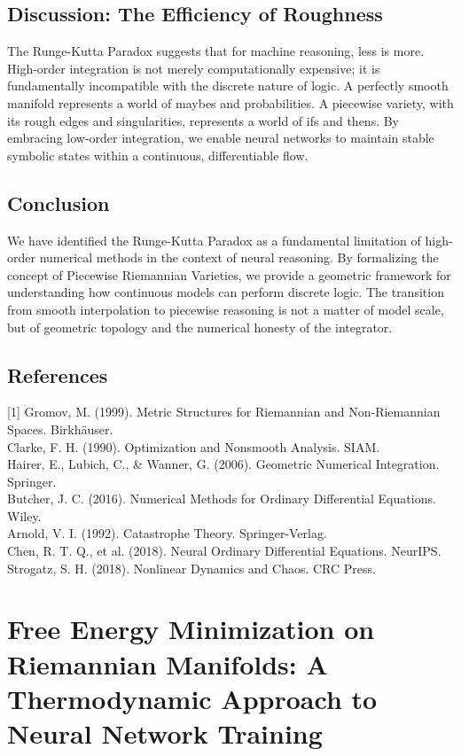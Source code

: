 \documentclass{article}
\numberwithin{equation}{section}
\begin{document}
\subsection{Discussion: The Efficiency of Roughness}
The Runge-Kutta Paradox suggests that for machine reasoning, less is more. High-order integration is not merely computationally expensive; it is fundamentally incompatible with the discrete nature of logic.
A perfectly smooth manifold represents a world of maybes and probabilities. A piecewise variety, with its rough edges and singularities, represents a world of ifs and thens. By embracing low-order integration, we enable neural networks to maintain stable symbolic states within a continuous, differentiable flow.

\subsection{Conclusion}
We have identified the Runge-Kutta Paradox as a fundamental limitation of high-order numerical methods in the context of neural reasoning. By formalizing the concept of Piecewise Riemannian Varieties, we provide a geometric framework for understanding how continuous models can perform discrete logic. The transition from smooth interpolation to piecewise reasoning is not a matter of model scale, but of geometric topology and the numerical honesty of the integrator.

\subsection*{References}
[1] Gromov, M. (1999). Metric Structures for Riemannian and Non-Riemannian Spaces. Birkhäuser.\\
[2] Clarke, F. H. (1990). Optimization and Nonsmooth Analysis. SIAM.\\
[3] Hairer, E., Lubich, C., \& Wanner, G. (2006). Geometric Numerical Integration. Springer.\\
[4] Butcher, J. C. (2016). Numerical Methods for Ordinary Differential Equations. Wiley.\\
[5] Arnold, V. I. (1992). Catastrophe Theory. Springer-Verlag.\\
[6] Chen, R. T. Q., et al. (2018). Neural Ordinary Differential Equations. NeurIPS.\\
[7] Strogatz, S. H. (2018). Nonlinear Dynamics and Chaos. CRC Press.

\section{Free Energy Minimization on Riemannian Manifolds: A Thermodynamic Approach to Neural Network Training}
\end{document}
